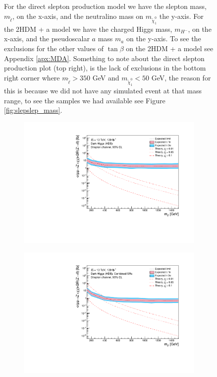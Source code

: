 \documentclass[12pt, a4paper]{book}
\begin{document}
\begin{figure}[!ht]
{      For the direct slepton production model we have the slepton mass, $m_{\tilde{\ell}}$, on the x-axis, and the neutralino mass on $m_{\tilde{\chi}_1^0}$ the y-axis. 
      For the 2HDM + a model we have the charged Higgs mass, $m_{H^-}$, on the x-axis, and the pseudoscalar $a$ mass $m_{a}$ on the y-axis. To see the exclusions for the other values of $\tan\beta$ on the 2HDM + a model see Appendix \ref{apx:MDA}.  
      Something to note about the direct slepton production plot (top right), is the lack of exclusions in the bottom right corner where $m_{\tilde{\ell}}>350$ GeV and $m_{\tilde{\chi}_1^0}<50$ GeV, the reason for this is because we did not have any simulated event at that mass range, 
      to see the samples we had available see Figure \ref{fig:slepslep_mass}.}\label{fig:comp_nonZp}
\end{figure}
\begin{figure}[!ht]
	\centering
	\begin{subfigure}[b]{0.49\textwidth}
      \centering
      \includegraphics[width=1\textwidth]{Limits/DH_HDS/mass_exclusion_comb.pdf}
   \end{subfigure}
   \hfill
   \begin{subfigure}[b]{0.49\textwidth}
      \centering
      \includegraphics[width=1\textwidth]{Limits/Model_independent/DH_HDS/mass_exclusion_comb.pdf}

\end{subfigure}
\end{figure}
\end{document}

